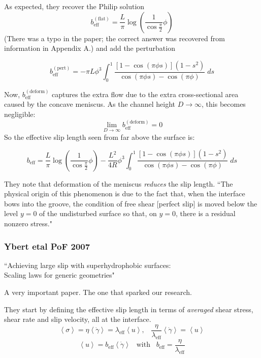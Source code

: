 \documentclass{article}
\newcommand{\beff}{\ensuremath{b_{\mathrm{eff}}}}
\begin{document}
As expected, they recover the Philip solution
\[ b_{\mathrm{eff}}^{\mathrm{(flat)}} =  \frac{L}{\pi} \log 
\left( \frac{1}{\cos \frac{\pi}{2}} \phi  \right) \]
(There was a typo in the paper; the correct answer was recovered from information in Appendix A.)
and add the perturbation

\[ b_{\mathrm{eff}}^{\mathrm{(pert)}} = - \pi L \phi^{3}
 \int_{0}^{1} \frac{[1 - \cos(\pi \phi s)] (1 - s^{2})}{\cos(\pi \phi s) - \cos(\pi \phi)} \;ds \]
 
Now, $ b_{\mathrm{eff}}^{\mathrm{(deform)}} $ captures the extra flow due to the extra cross-sectional area caused by the concave meniscus. As the channel height $D \rightarrow \infty$, this becomes negligible:
\[ \lim_{D \rightarrow \infty} b_{\mathrm{eff}}^{\mathrm{(deform)}} = 0 \]
So the effective slip length seen from far above the surface is:

\[ b_{\mathrm{eff}} = \frac{L}{\pi} \log 
\left( \frac{1}{\cos \frac{\pi}{2}} \phi  \right) 
- \frac{L^{2}}{4 R} \phi^{3} \int_{0}^{1} 
\frac{[1 - \cos(\pi \phi s)] (1 - s^{2})}{\cos(\pi \phi s) - \cos(\pi \phi)} \;ds \]

They note that deformation of the meniscus \emph{reduces} the slip length.  ``The physical origin of this phenomenon is due to the fact that, when the interface bows into the groove, the condition of free shear [perfect slip] is moved below the level $y = 0$ of the undisturbed surface so that, on $y = 0$, there is a residual nonzero stress." 

\subsubsection*{Ybert etal PoF 2007}
\newcommand{\phisol}{\ensuremath{\phi_{\mathrm{solid}}}}

``Achieving large slip with superhydrophobic surfaces:\\
Scaling laws for generic geometries"

A very important paper.  The one that sparked our research.

They start by defining the effective slip length in terms of \emph{averaged} shear stress, shear rate and slip velocity, all at the interface.
\[ \left< \sigma \right> = \eta \left< \dot{\gamma} \right> =
 \lambda_{\mathrm{eff}} \left< u \right>, \;\;\;
\frac{ \eta}{\lambda_{\mathrm{eff}}} \left< \dot{\gamma} \right> =
  \left< u \right> \]
 \[ \left< u \right> = \beff \left< \dot{\gamma} \right> 
 \;\;\; \mathrm{with} \;\;\; \beff = \frac{\eta}{\lambda_{\mathrm{eff}}} \]
 
\end{document}
